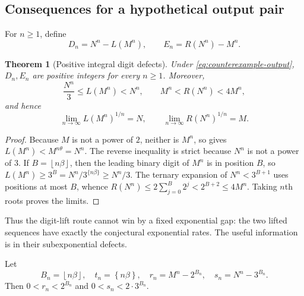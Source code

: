 \documentclass[11pt]{article}
\newtheorem{theorem}{Theorem}[section]
\theoremstyle{definition}
\theoremstyle{remark}
\newcommand{\fract}[1]{\left\{#1\right\}}
\newcommand{\floor}[1]{\left\lfloor#1\right\rfloor}
\begin{document}
\subsection{Consequences for a hypothetical output pair}

For $n\ge1$, define
\begin{equation}\label{eq:power-defects}
 D_n=N^n-L(M^n),
 \qquad
 E_n=R(N^n)-M^n.
\end{equation}

\begin{theorem}[Positive integral digit defects]\label{thm:positive-defects}
Under \eqref{eq:counterexample-output}, $D_n,E_n$ are positive integers for every
$n\ge1$.  Moreover,
\begin{equation}\label{eq:defect-growth-brackets}
 \frac{N^n}{3}\le L(M^n)<N^n,
 \qquad
 M^n<R(N^n)<4M^n,
\end{equation}
and hence
\begin{equation}\label{eq:digit-growth-rates}
 \lim_{n\to\infty}L(M^n)^{1/n}=N,
 \qquad
 \lim_{n\to\infty}R(N^n)^{1/n}=M.
\end{equation}
\end{theorem}

\begin{proof}
Because $M$ is not a power of $2$, neither is $M^n$, so
 gives
$L(M^n)<M^{n\theta}=N^n$.  The reverse inequality is strict because $N^n$ is not a
power of $3$.  If $B=\floor{n\beta}$, then the leading binary digit of $M^n$ is in
position $B$, so $L(M^n)\ge3^B=N^n/3^{\{n\beta\}}\ge N^n/3$.  The ternary expansion
of $N^n<3^{B+1}$ uses positions at most $B$, whence
$R(N^n)\le2\sum_{j=0}^{B}2^j<2^{B+2}\le4M^n$.  Taking $n$th roots proves the limits.
\end{proof}

Thus the digit-lift route cannot win by a fixed exponential gap: the two lifted
sequences have exactly the conjectural exponential rates.  The useful information is
in their subexponential defects.

Let
\begin{equation}\label{eq:power-tail-notation}
 B_n=\floor{n\beta},\quad t_n=\fract{n\beta},\quad
 r_n=M^n-2^{B_n},\quad s_n=N^n-3^{B_n}.
\end{equation}
Then $0<r_n<2^{B_n}$ and $0<s_n<2\cdot3^{B_n}$.
\end{document}
